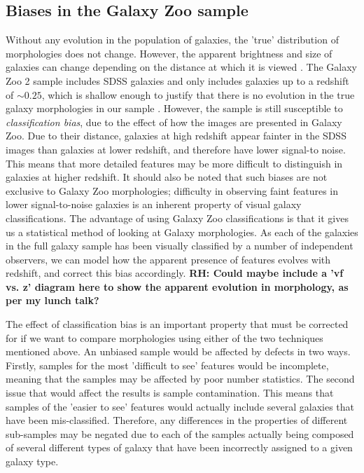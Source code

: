 \documentclass[useAMS,usenatbib]{mn2e}
\newcommand{\rh}[1]{{\bf \textcolor{RoyalPurple}{RH: #1}}}
\begin{document}
\subsection{Biases in the Galaxy Zoo sample}

Without any evolution in the population of galaxies, the 'true' distribution of morphologies does not change. However, the apparent brightness and size of galaxies can change depending on the distance at which it is viewed \citep{Bamford_09}. The Galaxy Zoo 2 sample includes SDSS galaxies and only includes galaxies up to a redshift of $\sim 0.25$, which is shallow enough to justify that there is no evolution in the true galaxy morphologies in our sample \citep{Willett_13}. However, the sample is still susceptible to \textit{classification bias}, due to the effect of how the images are presented in Galaxy Zoo. Due to their distance, galaxies at high redshift appear fainter in the SDSS images than galaxies at lower redshift, and therefore have lower signal-to noise. This means that more detailed features may be more difficult to distinguish in galaxies at higher redshift. It should also be noted that such biases are not exclusive to Galaxy Zoo morphologies; difficulty in observing faint features in lower signal-to-noise galaxies is an inherent property of visual galaxy classifications. The advantage of using Galaxy Zoo classifications is that it gives us a statistical method of looking at Galaxy morphologies. As each of the galaxies in the full galaxy sample has been visually classified by a number of independent observers, we can model how the apparent presence of features evolves with redshift, and correct this bias accordingly.  \rh{Could maybe include a 'vf vs. z' diagram here to show the apparent evolution in morphology, as per my lunch talk?}

The effect of classification bias is an important property that must be corrected for if we want to compare morphologies using either of the two techniques mentioned above. An unbiased sample would be affected by defects in two ways. Firstly, samples for the most 'difficult to see' features would be incomplete, meaning that the samples may be affected by poor number statistics. The second issue that would affect the results is sample contamination. This means that samples of the 'easier to see' features would actually include several galaxies that have been mis-classified. Therefore, any differences in the properties of different sub-samples may be negated due to each of the samples actually being composed of several different types of galaxy that have been incorrectly assigned to a given galaxy type. 
\end{document}
